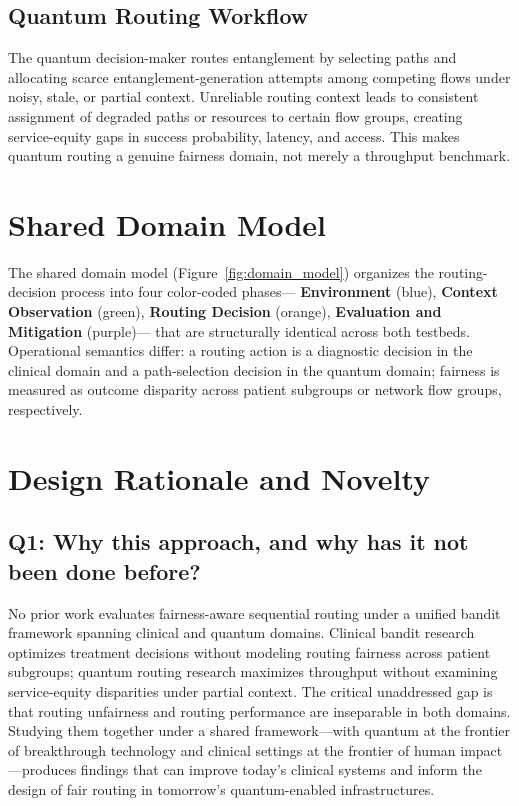 \documentclass{IEEEtran}
\begin{document}
\subsection{Quantum Routing Workflow}
The quantum decision-maker routes entanglement by selecting paths and
allocating scarce entanglement-generation attempts among competing flows
under noisy, stale, or partial context. Unreliable routing context leads to
consistent assignment of degraded paths or resources to certain flow groups,
creating service-equity gaps in success probability, latency, and access.
This makes quantum routing a genuine fairness domain, not merely a
throughput benchmark.

\section{Shared Domain Model}

The shared domain model (Figure~\ref{fig:domain_model}) organizes the
routing-decision process into four color-coded phases---
\textcolor{phase1blue}{\textbf{Environment}} (blue),
\textcolor{phase2green}{\textbf{Context Observation}} (green),
\textcolor{phase3orange}{\textbf{Routing Decision}} (orange),
\textcolor{phase4purple}{\textbf{Evaluation and Mitigation}} (purple)---
that are structurally identical across both testbeds. Operational semantics
differ: a routing action is a diagnostic decision in the clinical domain and
a path-selection decision in the quantum domain; fairness is measured as
outcome disparity across patient subgroups or network flow groups,
respectively.

\section{Design Rationale and Novelty}

\subsection{Q1: Why this approach, and why has it not been done before?}
No prior work evaluates fairness-aware sequential routing under a unified
bandit framework spanning clinical and quantum domains. Clinical bandit
research optimizes treatment decisions without modeling routing fairness
across patient subgroups; quantum routing research maximizes throughput
without examining service-equity disparities under partial context. The
critical unaddressed gap is that routing unfairness and routing performance
are inseparable in both domains. Studying them together under a shared
framework---with quantum at the frontier of breakthrough technology and
clinical settings at the frontier of human impact---produces findings that
can improve today's clinical systems and inform the design of fair routing
in tomorrow's quantum-enabled infrastructures.
\end{document}
